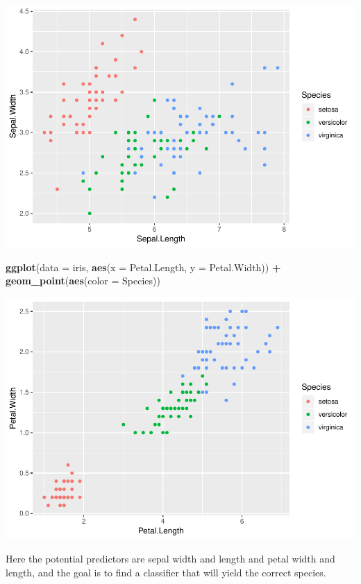 \documentclass[]{article}
\newenvironment{Shaded}{\begin{snugshade}}{\end{snugshade}}
\newcommand{\KeywordTok}[1]{\textcolor[rgb]{0.13,0.29,0.53}{\textbf{#1}}}
\newcommand{\DataTypeTok}[1]{\textcolor[rgb]{0.13,0.29,0.53}{#1}}
\newcommand{\StringTok}[1]{\textcolor[rgb]{0.31,0.60,0.02}{#1}}
\newcommand{\OperatorTok}[1]{\textcolor[rgb]{0.81,0.36,0.00}{\textbf{#1}}}
\newcommand{\NormalTok}[1]{#1}
\begin{document}
\includegraphics{stt-301-programming_files/figure-latex/unnamed-chunk-176-1.pdf}

\begin{Shaded}
\begin{Highlighting}[]
\KeywordTok{ggplot}\NormalTok{(}\DataTypeTok{data =}\NormalTok{ iris, }\KeywordTok{aes}\NormalTok{(}\DataTypeTok{x =}\NormalTok{ Petal.Length, }\DataTypeTok{y =}\NormalTok{ Petal.Width)) }\OperatorTok{+}
\StringTok{    }\KeywordTok{geom_point}\NormalTok{(}\KeywordTok{aes}\NormalTok{(}\DataTypeTok{color =}\NormalTok{ Species))}
\end{Highlighting}
\end{Shaded}

\includegraphics{stt-301-programming_files/figure-latex/unnamed-chunk-177-1.pdf}

Here the potential predictors are sepal width and length and petal width
and length, and the goal is to find a classifier that will yield the
correct species.
\end{document}
